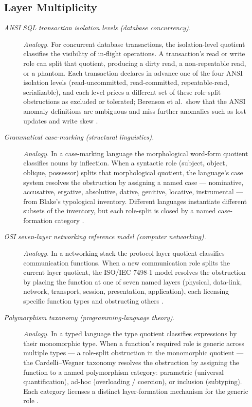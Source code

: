\subsection*{ Layer Multiplicity}
\begingroup\small
\begin{description}
\item[\emph{{ANSI} {SQL} transaction isolation levels (database
concurrency).}] \textit{Analogy.}
For concurrent database transactions, the isolation-level quotient
classifies the visibility of in-flight operations.  A transaction's read or write role can split that quotient,
producing a dirty read, a non-repeatable read, or a phantom.  Each
transaction declares in advance one of the four ANSI isolation levels
(read-uncommitted, read-committed, repeatable-read, serializable),
and each level prices a different set of these role-split
obstructions as excluded or tolerated; Berenson et al.\ show that the
ANSI anomaly definitions are ambiguous and miss further anomalies
such as lost updates and write skew
\citep{BerensonBernsteinGrayMeltonONeilONeil1995SQLIsolation}.

\item[\emph{Grammatical case-marking (structural linguistics).}] \textit{Analogy.}
In a case-marking language the morphological word-form quotient
classifies nouns by inflection.  When a syntactic role (subject,
object, oblique, possessor) splits that morphological quotient, the
language's case system resolves the obstruction by assigning a
named case --- nominative, accusative, ergative, absolutive,
dative, genitive, locative, instrumental --- from Blake's
typological inventory.  Different languages instantiate different
subsets of the inventory, but each role-split is closed by a named
case-formation category
\citep{Blake2001Case}.

\item[\emph{{OSI} seven-layer networking reference model (computer
networking).}] \textit{Analogy.}
In a networking stack the protocol-layer quotient classifies
communication functions.  When a new communication role splits the
current layer quotient, the ISO/IEC 7498-1 model resolves the
obstruction by placing the function at one of seven named layers
(physical, data-link, network, transport, session, presentation,
application), each licensing specific function types and obstructing
others
\citep{ISOIEC7498OSI}.

\item[\emph{Polymorphism taxonomy (programming-language theory).}] \textit{Analogy.}
In a typed language the type quotient classifies expressions by
their monomorphic type.  When a function's required role is
generic across multiple types --- a role-split obstruction in the
monomorphic quotient --- the Cardelli--Wegner taxonomy resolves
the obstruction by assigning the function to a named polymorphism
category: parametric (universal quantification), ad-hoc (overloading /
coercion), or inclusion (subtyping).  Each category
licenses a distinct layer-formation mechanism for the generic role
\citep{CardelliWegner1985UnderstandingTypes}.
\end{description}
\endgroup

